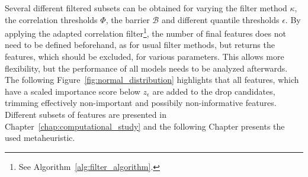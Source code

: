 Several different filtered subsets can be obtained for varying the filter method $\kappa$, the correlation thresholds $\Phi$, the barrier $\mathcal{B}$ and
different quantile thresholds $\epsilon$. By applying the adapted correlation filter\footnote{See Algorithm~\ref{alg:filter_algorithm}.}, the number of final
features does not need to be defined beforehand, as for usual filter methods, but returns the features, which should be excluded, for
various parameters. This allows more flexibility, but the performance of all models needs to be analyzed afterwards.
The following Figure~\ref{fig:normal_distribution} highlights that all features, which have a scaled importance score below $z_{\epsilon}$ are added to the drop candidates, trimming
effectively non-important and possibily non-informative features. Different subsets of features are presented in Chapter~\ref{chap:computational_study} and the following Chapter
presents the used metaheuristic.

